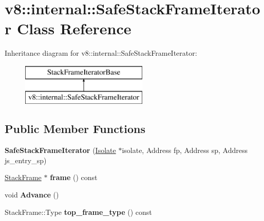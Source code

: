 \hypertarget{classv8_1_1internal_1_1_safe_stack_frame_iterator}{}\section{v8\+:\+:internal\+:\+:Safe\+Stack\+Frame\+Iterator Class Reference}
\label{classv8_1_1internal_1_1_safe_stack_frame_iterator}
Inheritance diagram for v8\+:\+:internal\+:\+:Safe\+Stack\+Frame\+Iterator\+:\begin{figure}[H]
\begin{center}
\leavevmode
\includegraphics[height=2.000000cm]{classv8_1_1internal_1_1_safe_stack_frame_iterator}
\end{center}
\end{figure}
\subsection*{Public Member Functions}
\begin{DoxyCompactItemize}
\item 
{\bfseries Safe\+Stack\+Frame\+Iterator} (\hyperlink{classv8_1_1internal_1_1_isolate}{Isolate} $\ast$isolate, Address fp, Address sp, Address js\+\_\+entry\+\_\+sp)\hypertarget{classv8_1_1internal_1_1_safe_stack_frame_iterator_afcd82bdd7ccef981aa610d54f65226e0}{}\label{classv8_1_1internal_1_1_safe_stack_frame_iterator_afcd82bdd7ccef981aa610d54f65226e0}

\item 
\hyperlink{classv8_1_1_stack_frame}{Stack\+Frame} $\ast$ {\bfseries frame} () const \hypertarget{classv8_1_1internal_1_1_safe_stack_frame_iterator_a92849282fab392c4dfc41769d7f90cfe}{}\label{classv8_1_1internal_1_1_safe_stack_frame_iterator_a92849282fab392c4dfc41769d7f90cfe}

\item 
void {\bfseries Advance} ()\hypertarget{classv8_1_1internal_1_1_safe_stack_frame_iterator_a277df3982f5c8decd465ca163c06c1f2}{}\label{classv8_1_1internal_1_1_safe_stack_frame_iterator_a277df3982f5c8decd465ca163c06c1f2}

\item 
Stack\+Frame\+::\+Type {\bfseries top\+\_\+frame\+\_\+type} () const \hypertarget{classv8_1_1internal_1_1_safe_stack_frame_iterator_ac7da0b6eec5ab71b9bdeade5808c39a1}{}\label{classv8_1_1internal_1_1_safe_stack_frame_iterator_ac7da0b6eec5ab71b9bdeade5808c39a1}

\end{DoxyCompactItemize}
